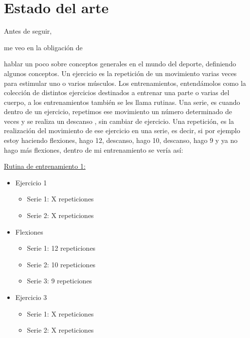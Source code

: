 \chapter{Estado del arte}


Antes de seguir, %

me veo en la obligación de %

hablar un poco sobre conceptos generales en el mundo del deporte, definiendo algunos conceptos. Un ejercicio 
es la repetición de un movimiento varias veces para estimular uno o varios músculos. Los entrenamientos, entendámolos como la colección de distintos ejercicios destinados a entrenar una parte o varias del cuerpo, a los entrenamientos también se les llama rutinas. Una serie, es cuando dentro de un ejercicio, repetimos ese movimiento un número determinado de veces y se realiza un descanso
, sin cambiar de ejercicio. Una repetición, es la realización del movimiento de ese ejercicio en una serie, es decir, si por ejemplo estoy haciendo flexiones, hago 12, descanso, hago 10, descanso, hago 9 y ya no hago más flexiones, dentro de mi entrenamiento se vería así:

\underline {Rutina de entrenamiento 1:}
\begin{itemize}
	\item Ejercicio 1
	\begin{itemize}
		\item Serie 1: X repeticiones
		\item Serie 2: X repeticiones
	\end{itemize}
	\item Flexiones
	\begin{itemize}
		\item Serie 1: 12 repeticiones
		\item Serie 2: 10 repeticiones 
		\item Serie 3: 9 repeticiones
	\end{itemize}
	\item Ejercicio 3
	\begin{itemize}
		\item Serie 1: X repeticiones
		\item Serie 2: X repeticiones
	\end{itemize}
\end{itemize}

